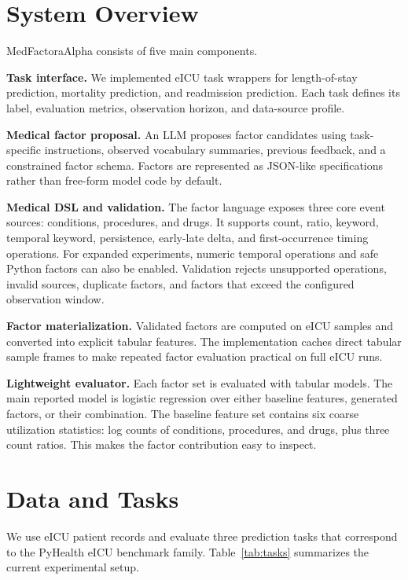 \documentclass[letterpaper]{article}
\begin{document}
\section{System Overview}

MedFactoraAlpha consists of five main components.

\textbf{Task interface.}
We implemented eICU task wrappers for length-of-stay prediction, mortality prediction, and readmission prediction. Each task defines its label, evaluation metrics, observation horizon, and data-source profile.

\textbf{Medical factor proposal.}
An LLM proposes factor candidates using task-specific instructions, observed vocabulary summaries, previous feedback, and a constrained factor schema. Factors are represented as JSON-like specifications rather than free-form model code by default.

\textbf{Medical DSL and validation.}
The factor language exposes three core event sources: conditions, procedures, and drugs. It supports count, ratio, keyword, temporal keyword, persistence, early-late delta, and first-occurrence timing operations. For expanded experiments, numeric temporal operations and safe Python factors can also be enabled. Validation rejects unsupported operations, invalid sources, duplicate factors, and factors that exceed the configured observation window.

\textbf{Factor materialization.}
Validated factors are computed on eICU samples and converted into explicit tabular features. The implementation caches direct tabular sample frames to make repeated factor evaluation practical on full eICU runs.

\textbf{Lightweight evaluator.}
Each factor set is evaluated with tabular models. The main reported model is logistic regression over either baseline features, generated factors, or their combination. The baseline feature set contains six coarse utilization statistics: log counts of conditions, procedures, and drugs, plus three count ratios. This makes the factor contribution easy to inspect.

\section{Data and Tasks}

We use eICU patient records and evaluate three prediction tasks that correspond to the PyHealth eICU benchmark family. Table~\ref{tab:tasks} summarizes the current experimental setup.
\end{document}
